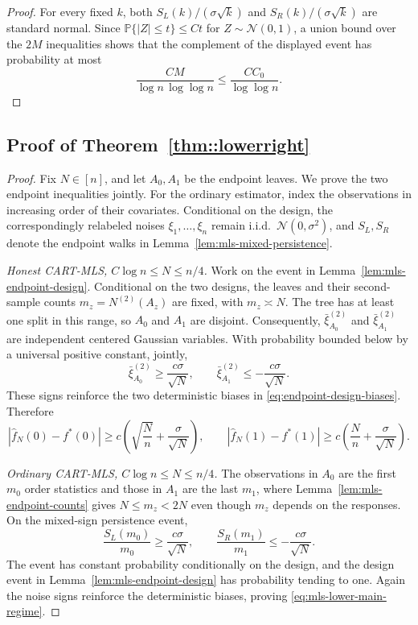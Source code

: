 \documentclass[11pt]{article}
\theoremstyle{plain}
\theoremstyle{definition}
\theoremstyle{remark}
\theoremstyle{plain}
\renewcommand{\P}{\mathbb{P}}
\newcommand{\1}{\mathbbm{1}}
\begin{document}
\begin{proof}
For every fixed $k$, both $S_L(k)/(\sigma\sqrt{k})$ and
$S_R(k)/(\sigma\sqrt{k})$ are standard normal. Since
$\P\{|Z|\le t\}\le Ct$ for $Z\sim\mathcal N(0,1)$, a union bound over the
$2M$ inequalities shows that the complement of the displayed event has
probability at most
\[
 \frac{C M}{\log n\,\log\log n}
 \le\frac{CC_0}{\log\log n}.
\]
\end{proof}

\subsection{Proof of Theorem~\ref{thm::lowerright}}

\begin{proof}
Fix $N\in[n]$, and let $A_0,A_1$ be the endpoint leaves. We prove the two
endpoint inequalities jointly.
For the ordinary estimator, index the observations in increasing order of
their covariates. Conditional on the design, the correspondingly relabeled
noises $\xi_1,\ldots,\xi_n$ remain i.i.d.\ $\mathcal N(0,\sigma^2)$, and
$S_L,S_R$ denote the endpoint walks in
Lemma~\ref{lem:mls-mixed-persistence}.

\medskip\noindent
\textit{Honest CART-MLS, $C\log n\le N\le n/4$.}
Work on the event in Lemma~\ref{lem:mls-endpoint-design}. Conditional on
the two designs, the leaves and their second-sample counts
$m_z=N^{(2)}(A_z)$ are fixed, with $m_z\asymp N$. The tree has at least
one split in this range, so $A_0$ and $A_1$ are disjoint. Consequently,
$\bar\xi_{A_0}^{(2)}$ and $\bar\xi_{A_1}^{(2)}$ are independent centered
Gaussian variables. With probability bounded below by a universal positive
constant, jointly,
\[
 \bar\xi_{A_0}^{(2)}\ge\frac{c\sigma}{\sqrt N},
 \qquad
 \bar\xi_{A_1}^{(2)}\le-\frac{c\sigma}{\sqrt N}.
\]
These signs reinforce the two deterministic biases in
\eqref{eq:endpoint-design-biases}. Therefore
\[
 |\widehat f_N(0)-f^*(0)|
 \ge c\left(\sqrt{\frac{N}{n}}+\frac{\sigma}{\sqrt N}\right),
 \qquad
 |\widehat f_N(1)-f^*(1)|
 \ge c\left(\frac{N}{n}+\frac{\sigma}{\sqrt N}\right).
\]

\medskip\noindent
\textit{Ordinary CART-MLS, $C\log n\le N\le n/4$.}
The observations in $A_0$ are the first $m_0$ order statistics and those
in $A_1$ are the last $m_1$, where
Lemma~\ref{lem:mls-endpoint-counts} gives $N\le m_z<2N$ even though
$m_z$ depends on the responses. On the mixed-sign persistence event,
\[
 \frac{S_L(m_0)}{m_0}\ge\frac{c\sigma}{\sqrt N},
 \qquad
 \frac{S_R(m_1)}{m_1}\le-\frac{c\sigma}{\sqrt N}.
\]
The event has constant probability conditionally on the design, and the
design event in Lemma~\ref{lem:mls-endpoint-design} has probability tending
to one. Again the noise signs reinforce the deterministic biases, proving
\eqref{eq:mls-lower-main-regime}.


\end{proof}
\end{document}
